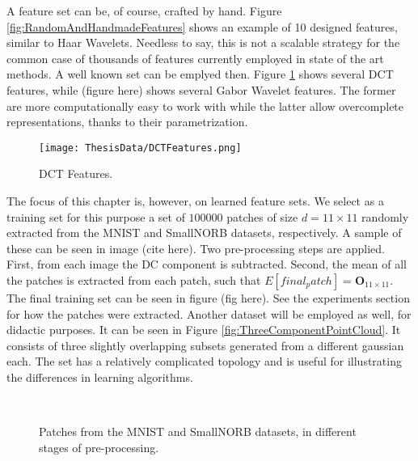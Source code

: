 \documentclass[12pt,a4paper,oneside,english]{UPBThesis}
\newcommand{\hctimes}[2]{{#1}\!\times\!{#2}}
\begin{document}
A feature set can be, of course, crafted by hand. Figure \ref{fig:RandomAndHandmadeFeatures} shows an example of 10 designed features, similar to Haar Wavelets. Needless to say, this is not a scalable strategy for the common case of thousands of features currently employed in state of the art methods. A well known set can be emplyed then. Figure \ref{fig:DCTFeatures} shows several DCT features, while (figure here) shows several Gabor Wavelet features. The former are more computationally easy to work with while the latter allow overcomplete representations, thanks to their parametrization.

\begin{figure}
\texttt{[image: ThesisData/DCTFeatures.png]}
\caption{DCT Features.}
\label{fig:DCTFeatures}
\end{figure}

The focus of this chapter is, however, on learned feature sets. We select as a training set for this purpose a set of $100000$ patches of size $d = \hctimes{11}{11}$ randomly extracted from the MNIST and SmallNORB datasets, respectively. A sample of these can be seen in image (cite here). Two pre-processing steps are applied. First, from each image the DC component is subtracted. Second, the mean of all the patches is extracted from each patch, such that $E[final_patch] = \textbf{O}_{\hctimes{11}{11}}$. The final training set can be seen in figure (fig here). See the experiments section for how the patches were extracted. Another dataset will be employed as well, for didactic purposes. It can be seen in Figure \ref{fig:ThreeComponentPointCloud}. It consists of three slightly overlapping subsets generated from a different gaussian each. The set has a relatively complicated topology and is useful for illustrating the differences in learning algorithms.

\begin{figure}
\centering
{}
~~~~~~
~~~~~~
~~~~~~
\caption{Patches from the MNIST and SmallNORB datasets, in different stages of pre-processing.}
\label{fig:Patches}
\end{figure}
\end{document}
